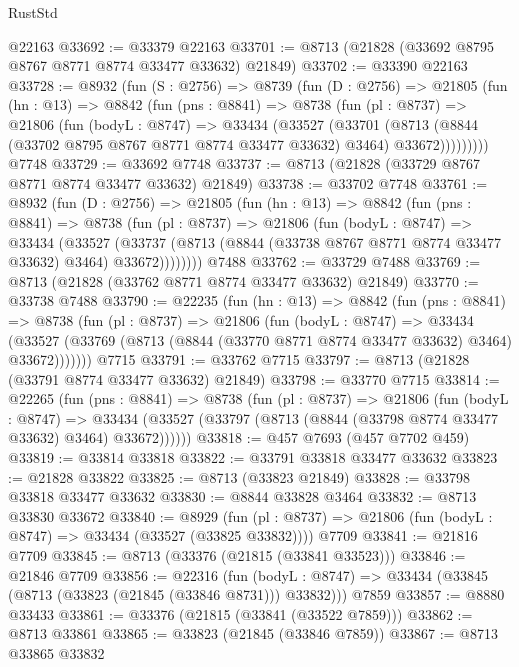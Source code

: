 \begin{lexlean}{RustStd}
\begin{coremodule}
    @22163
@33692 := @33379 @22163
@33701 := @8713 (@21828 (@33692 @8795 @8767 @8771 @8774 @33477 @33632) @21849)
@33702 := @33390 @22163
@33728 := @8932
    (fun (S : @2756) =>
    @8739
      (fun (D : @2756) =>
      @21805
        (fun (hn : @13) =>
        @8842
          (fun (pns : @8841) =>
          @8738
            (fun (pl : @8737) =>
            @21806
              (fun (bodyL : @8747) =>
              @33434
                (@33527
                  (@33701
                    (@8713
                      (@8844 (@33702 @8795 @8767 @8771 @8774 @33477 @33632) @3464)
                      @33672)))))))))
    @7748
@33729 := @33692 @7748
@33737 := @8713 (@21828 (@33729 @8767 @8771 @8774 @33477 @33632) @21849)
@33738 := @33702 @7748
@33761 := @8932
    (fun (D : @2756) =>
    @21805
      (fun (hn : @13) =>
      @8842
        (fun (pns : @8841) =>
        @8738
          (fun (pl : @8737) =>
          @21806
            (fun (bodyL : @8747) =>
            @33434
              (@33527
                (@33737 (@8713 (@8844 (@33738 @8767 @8771 @8774 @33477 @33632) @3464) @33672))))))))
    @7488
@33762 := @33729 @7488
@33769 := @8713 (@21828 (@33762 @8771 @8774 @33477 @33632) @21849)
@33770 := @33738 @7488
@33790 := @22235
    (fun (hn : @13) =>
    @8842
      (fun (pns : @8841) =>
      @8738
        (fun (pl : @8737) =>
        @21806
          (fun (bodyL : @8747) =>
          @33434
            (@33527 (@33769 (@8713 (@8844 (@33770 @8771 @8774 @33477 @33632) @3464) @33672)))))))
    @7715
@33791 := @33762 @7715
@33797 := @8713 (@21828 (@33791 @8774 @33477 @33632) @21849)
@33798 := @33770 @7715
@33814 := @22265
    (fun (pns : @8841) =>
    @8738
      (fun (pl : @8737) =>
      @21806
        (fun (bodyL : @8747) =>
        @33434 (@33527 (@33797 (@8713 (@8844 (@33798 @8774 @33477 @33632) @3464) @33672))))))
@33818 := @457 @7693 (@457 @7702 @459)
@33819 := @33814 @33818
@33822 := @33791 @33818 @33477 @33632
@33823 := @21828 @33822
@33825 := @8713 (@33823 @21849)
@33828 := @33798 @33818 @33477 @33632
@33830 := @8844 @33828 @3464
@33832 := @8713 @33830 @33672
@33840 := @8929
    (fun (pl : @8737) => @21806 (fun (bodyL : @8747) => @33434 (@33527 (@33825 @33832))))
    @7709
@33841 := @21816 @7709
@33845 := @8713 (@33376 (@21815 (@33841 @33523)))
@33846 := @21846 @7709
@33856 := @22316
    (fun (bodyL : @8747) => @33434 (@33845 (@8713 (@33823 (@21845 (@33846 @8731))) @33832)))
    @7859
@33857 := @8880 @33433
@33861 := @33376 (@21815 (@33841 (@33522 @7859)))
@33862 := @8713 @33861
@33865 := @33823 (@21845 (@33846 @7859))
@33867 := @8713 @33865 @33832

\end{coremodule}
\end{lexlean}
